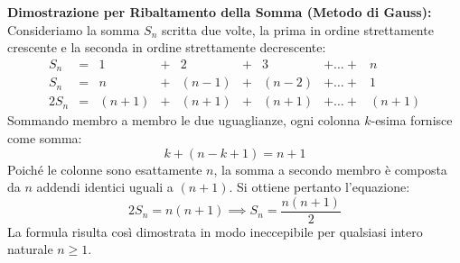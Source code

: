 \documentclass[11pt,a4paper,oneside]{report}
\begin{document}
\noindent
\textbf{Dimostrazione per Ribaltamento della Somma (Metodo di Gauss):}\\
Consideriamo la somma $S_n$ scritta due volte, la prima in ordine strettamente crescente e la seconda in ordine strettamente decrescente:
\[
\begin{array}{rccccccccc}
S_n & = & 1 & + & 2 & + & 3 & + \dots + & n \\
S_n & = & n & + & (n-1) & + & (n-2) & + \dots + & 1 \\
\hline
2S_n & = & (n+1) & + & (n+1) & + & (n+1) & + \dots + & (n+1)
\end{array}
\]
Sommando membro a membro le due uguaglianze, ogni colonna $k$-esima fornisce come somma:
\[
k + (n - k + 1) = n + 1
\]
Poich\'e le colonne sono esattamente $n$, la somma a secondo membro \`e composta da $n$ addendi identici uguali a $(n + 1)$. Si ottiene pertanto l'equazione:
\[
2S_n = n(n + 1) \implies S_n = \frac{n(n + 1)}{2}
\]
La formula risulta cos\`i dimostrata in modo ineccepibile per qualsiasi intero naturale $n \ge 1$.
\end{document}
